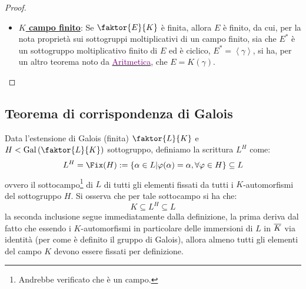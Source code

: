 \documentclass[11pt]{scrartcl}
\begin{document}
\begin{proof}
\begin{itemize}
\[            \]
        da cui $\varphi_i \equiv \varphi_j$ (cioè $i = j$) perché $E = K(\alpha,\beta)$ (infatti due immersioni in cui i generatori coincidono sono la stessa immersione), ma ciò è assurdo, in quanto avevamo assunto $i < j$. Dunque il polinomio è non nullo ed ha grado limitato, 
        sappiamo quindi che $F(x)$ ha al più [in realtà esattamente] $\deg F(x)$ radici in $\ol K$ e poiché $K$ è un campo infinito, allora $\exists t \in K$ tale che $F(t) \ne 0$ (cioè il numero di radici è un sottoinsieme finito degli elementi di $K$, dunque c'è sempre un elemento che non è radice di $F(x)$), dunque:
        \[ F(t) = \prod_{i<j} (\underbrace{\varphi_i(\alpha)+t\varphi_i(\beta)}_{ = \varphi_i(\alpha+t\beta)}\underbrace{-\varphi_j(\alpha)-t\varphi_j(\beta)}_{ = -\varphi_j(\alpha+t\beta)}) \ne 0
            \]
        da ciò abbiamo che:
        \[ \varphi_i(\alpha+t\beta) \ne \varphi_j(\alpha+t\beta) \qquad \forall i \ne j
            \]
        quindi $\gamma = \alpha+t\beta$ ha $m$ coniugati (perché abbiamo appunto $m$ immersioni distinte), pertanto $[K(\gamma) : K] = m \implies E = K(\gamma)$ (ovvero le due estensioni dello stesso campo hanno lo stesso grado e quindi coincidono).
        \item \underline{\textbf{$K$ campo finito}}: Se $\faktor{E}{K}$ è finita, allora $E$ è finito, da cui, per la nota proprietà sui sottogruppi moltiplicativi di un campo finito, sia che $E^*$ è un 
        sottogruppo moltiplicativo finito di $E$ ed è ciclico, $E^* = \left<\gamma\right>$, si ha, per un altro teorema noto da \href{https://github.com/diego-unipi/Appunti-Aritmetica}{\textcolor{purple}{Aritmetica}}, che $E = K(\gamma)$.
        \end{itemize}
\end{proof}

\newpage
\subsection{Teorema di corrispondenza di Galois}
Data l'estensione di Galois (finita) $\faktor{L}{K}$ e $H < \Gal\left(\faktor{L}{K}\right)$ sottogruppo, definiamo la scrittura $L^H$ come:
\[ L^H = \Fix(H) := \{ \alpha \in L | \varphi(\alpha) = \alpha, \forall \varphi \in H \} \subseteq L
    \]
ovvero il sottocampo\footnote{Andrebbe verificato che è un campo.} di $L$ di tutti gli elementi fissati da tutti i $K$-automorfismi del sottogruppo $H$. Si osserva che per tale sottocampo si ha che:
\[ K \subseteq L^H \subseteq L
    \]
la seconda inclusione segue immediatamente dalla definizione, la prima deriva dal fatto che essendo i $K$-automorfismi in particolare delle immersioni di $L$ in $\ol K$ via identità (per come è definito il gruppo di Galois), allora almeno tutti gli elementi del campo $K$ devono essere fissati 
per definizione.
\end{document}
